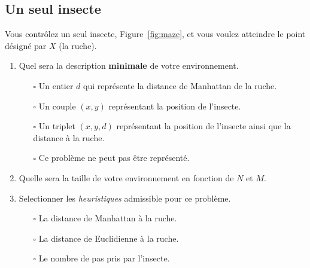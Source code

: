 \documentclass[12pt,letterpaper]{article}
\begin{document}
\subsection*{Un seul insecte}%
\label{sub:un_seul_insecte}

Vous contrôlez un seul insecte, Figure~\ref{fig:maze}, et vous voulez atteindre
le point désigné par $X$ (la ruche). 

\begin{enumerate}
  \item Quel sera la description \textbf{minimale} de votre environnement.
    \begin{itemize}
      \item[$\square$] Un entier $d$ qui représente la distance de Manhattan de
        la ruche.
      \item[$\square$] Un couple $(x,y)$ représentant la position de l'insecte.
      \item[$\square$] Un triplet $(x,y,d)$ représentant la position de
        l'insecte ainsi que la distance à la ruche.
      \item[$\square$] Ce problème ne peut pas être représenté.
    \end{itemize}
  \item Quelle sera la taille de votre environnement en fonction de $N$ et $M$.
  \item Selectionner les \emph{heuristiques} admissible pour ce problème.
    \begin{itemize}
      \item[$\square$] La distance de Manhattan à la ruche.
      \item[$\square$] La distance de Euclidienne à la ruche.
      \item[$\square$] Le nombre de pas pris par l'insecte.

    \end{itemize}
\end{enumerate}
\end{document}
